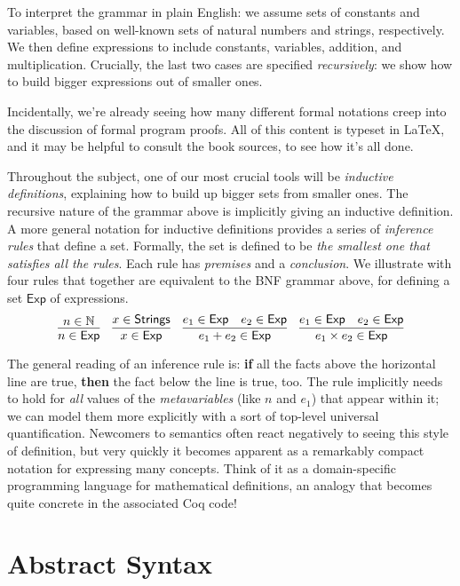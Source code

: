 \documentclass{amsbook}
\theoremstyle{definition}
\theoremstyle{remark}
\numberwithin{section}{chapter}
\numberwithin{equation}{chapter}
\begin{document}
To interpret the grammar in plain English: we assume sets of constants and variables, based on well-known sets of natural numbers and strings, respectively.
We then define expressions to include constants, variables, addition, and multiplication.
Crucially, the last two cases are specified \emph{recursively}: we show how to build bigger expressions out of smaller ones.

Incidentally, we're already seeing how many different formal notations creep into the discussion of formal program proofs.
All of this content is typeset in \LaTeX{}\index{\LaTeX{}}, and it may be helpful to consult the book sources, to see how it's all done.

Throughout the subject, one of our most crucial tools will be \emph{inductive definitions}, explaining how to build up bigger sets from smaller ones.
The recursive nature of the grammar above is implicitly giving an inductive definition.
A more general notation for inductive definitions provides a series of \emph{inference rules} that define a set.
Formally, the set is defined to be \emph{the smallest one that satisfies all the rules}.
Each rule has \emph{premises} and a \emph{conclusion}.
We illustrate with four rules that together are equivalent to the BNF grammar above, for defining a set $\mathsf{Exp}$ of expressions.
\encoding
$$\infer{n \in \mathsf{Exp}}{
  n \in \mathbb N
}
\quad \infer{x \in \mathsf{Exp}}{
  x \in \mathsf{Strings}
}
\quad \infer{e_1 + e_2 \in \mathsf{Exp}}{
  e_1 \in \mathsf{Exp}
  & e_2 \in \mathsf{Exp}
}
\quad \infer{e_1 \times e_2 \in \mathsf{Exp}}{
  e_1 \in \mathsf{Exp}
  & e_2 \in \mathsf{Exp}
}$$

The general reading of an inference rule is: \textbf{if} all the facts above the horizontal line are true, \textbf{then} the fact below the line is true, too.
The rule implicitly needs to hold for \emph{all} values of the \emph{metavariables} (like $n$ and $e_1$) that appear within it; we can model them more explicitly with a sort of top-level universal quantification.
Newcomers to semantics often react negatively to seeing this style of definition, but very quickly it becomes apparent as a remarkably compact notation for expressing many concepts.
Think of it as a domain-specific programming language for mathematical definitions, an analogy that becomes quite concrete in the associated Coq code!

\section{Abstract Syntax}
\end{document}
